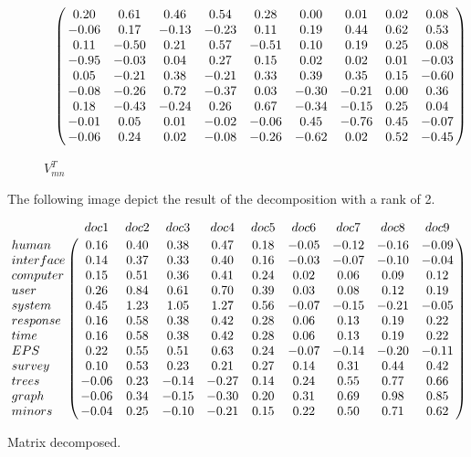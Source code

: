 \clearpage
\begin{figure}[h!]
	\begin{equation} \nonumber
	\bordermatrix{~  \cr	
		& 0.20 & 0.61 & 0.46 & 0.54 & 0.28 & 0.00 & 0.01 & 0.02 & 0.08 \cr
		& -0.06 & 0.17 & -0.13 & -0.23 & 0.11 & 0.19 & 0.44 & 0.62 & 0.53 \cr
		& 0.11 & -0.50 & 0.21 & 0.57 & -0.51 & 0.10 & 0.19 & 0.25 & 0.08 \cr
		& -0.95 & -0.03 & 0.04 & 0.27 & 0.15 & 0.02 & 0.02 & 0.01 & -0.03 \cr
		& 0.05 & -0.21 & 0.38 & -0.21 & 0.33 & 0.39 & 0.35 & 0.15 & -0.60 \cr
		& -0.08 & -0.26 & 0.72 & -0.37 & 0.03 & -0.30 & -0.21 & 0.00 & 0.36 \cr
		& 0.18 & -0.43 & -0.24 & 0.26 & 0.67 & -0.34 & -0.15 & 0.25 & 0.04 \cr
		& -0.01 & 0.05 & 0.01 & -0.02 & -0.06 & 0.45 & -0.76 & 0.45 & -0.07 \cr
		& -0.06 & 0.24 & 0.02 & -0.08 & -0.26 & -0.62 & 0.02 & 0.52 & -0.45 \cr	 
 }
	\end{equation}
	\caption{$V_{mn}^{T}$}
	\label{fig:TDM}
\end{figure}
The following image depict the result of the decomposition with a rank of 2.
\begin{table}[h!]
	\begin{equation} \nonumber
	\bordermatrix{~ & doc1 & doc2 & doc3 & doc4 & doc5 & doc6 & doc7 & doc8 & doc9 \cr	
		human 	& 0.16 & 0.40 & 0.38 & 0.47 & 0.18 & -0.05 & -0.12 & -0.16 & -0.09 \cr
		interface 	& 0.14 & 0.37 & 0.33 & 0.40 & 0.16 & -0.03 & -0.07 & -0.10 & -0.04 \cr
		computer	& 0.15 & 0.51 & 0.36 & 0.41 & 0.24 & 0.02 & 0.06 & 0.09 & 0.12 \cr
		user 		& 0.26 & 0.84 & 0.61 & 0.70 & 0.39 & 0.03 & 0.08 & 0.12 & 0.19 \cr
		system 	& 0.45 & 1.23 & 1.05 & 1.27 & 0.56 & -0.07 & -0.15 & -0.21 & -0.05 \cr
		response 	& 0.16 & 0.58 & 0.38 & 0.42 & 0.28 & 0.06 & 0.13 & 0.19 & 0.22 \cr
		time 		& 0.16 & 0.58 & 0.38 & 0.42 & 0.28 & 0.06 & 0.13 & 0.19 & 0.22 \cr
		EPS 	 	& 0.22 & 0.55 & 0.51 & 0.63 & 0.24 & -0.07 & -0.14 & -0.20 & -0.11 \cr 
		survey 	& 0.10 & 0.53 & 0.23 & 0.21 & 0.27 & 0.14 & 0.31 & 0.44 & 0.42 \cr
		trees 		& -0.06 & 0.23 & -0.14 & -0.27 & 0.14 & 0.24 & 0.55 & 0.77 & 0.66 \cr
		graph 		& -0.06 & 0.34 & -0.15 & -0.30 & 0.20 & 0.31 & 0.69 & 0.98 & 0.85 \cr
		minors 	& -0.04 & 0.25 & -0.10 & -0.21 & 0.15 & 0.22 & 0.50 & 0.71 & 0.62 \cr	  }
	\end{equation}
	\caption{Matrix decomposed.}
	\label{fig:TDM}
\end{table}
\clearpage
